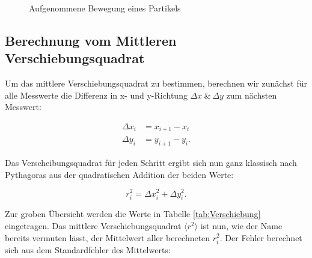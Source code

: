\documentclass{article}
\begin{document}
\begin{figure}[!h]
    \centering
    \caption{Aufgenommene Bewegung eines Partikels}
    \label{fig:brown1}
\end{figure}


\newpage
\subsection{Berechnung vom Mittleren Verschiebungsquadrat} \label{Boltzmann1}

Um das mittlere Verschiebungsquadrat zu bestimmen, berechnen wir zunächst für alle Messwerte die Differenz in x- und y-Richtung $\Delta x \ \& \ \Delta y$ zum nächsten Messwert:

\begin{equation}
    \begin{split}
        \Delta x_i &= x_{i+1} - x_i \\
        \Delta y_i &= y_{i+1} - y_i.
    \end{split}
\end{equation}

Das Verscheibungsquadrat für jeden Schritt ergibt sich nun ganz klassisch nach Pythagoras aus der quadratischen Addition der beiden Werte:

\begin{equation}
     r^2_i = \Delta x_i^2 + \Delta y_i^2.
\end{equation}

Zur groben Übersicht werden die Werte in Tabelle \ref{tab:Verschiebung} eingetragen. Das mittlere Verschiebungsquadrat $\langle r^2 \rangle$ ist nun, wie der Name bereits vermuten lässt, der Mittelwert aller berechneten $r^2_i$. Der Fehler berechnet sich aus dem Standardfehler des Mittelwerts:
\end{document}
